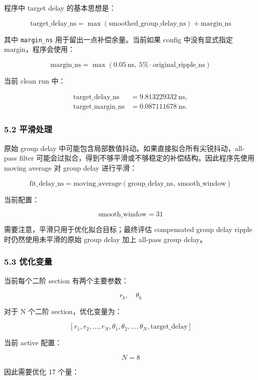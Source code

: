 \documentclass[
]{ctexart}
\begin{document}
程序中 target delay 的基本思想是：

\[
\mathrm{target\_delay\_ns}=\max(\mathrm{smoothed\_group\_delay\_ns})+\mathrm{margin\_ns}
\]

其中 \texttt{margin\_ns} 用于留出一点补偿余量。当前如果 config
中没有显式指定 margin，程序会使用：

\[
\mathrm{margin\_ns}=\max\left(0.05\ \mathrm{ns},\ 5\%\cdot\mathrm{original\_ripple\_ns}\right)
\]

当前 clean run 中：

\[
\begin{aligned}
\mathrm{target\_delay\_ns} &= 9.813229332\ \mathrm{ns},\\
\mathrm{target\_margin\_ns} &= 0.087111678\ \mathrm{ns}.
\end{aligned}
\]

\subsubsection{5.2 平滑处理}\label{ux5e73ux6ed1ux5904ux7406}

原始 group delay
中可能包含局部数值抖动。如果直接拟合所有尖锐抖动，all-pass filter
可能会过拟合，得到不够平滑或不够稳定的补偿结构。因此程序先使用 moving
average 对 group delay 进行平滑：

\[
\mathrm{fit\_delay\_ns}=\mathrm{moving\_average}(\mathrm{group\_delay\_ns},\ \mathrm{smooth\_window})
\]

当前配置：

\[
\mathrm{smooth\_window}=31
\]

需要注意，平滑只用于优化拟合目标；最终评估 compensated group delay
ripple 时仍然使用未平滑的原始 group delay 加上 all-pass group delay。

\subsubsection{5.3 优化变量}\label{ux4f18ux5316ux53d8ux91cf}

当前每个二阶 section 有两个主要参数：

\[
r_k,\quad \theta_k
\]

对于 N 个二阶 section，优化变量为：

\[
\left[r_1,r_2,\ldots,r_N,\theta_1,\theta_2,\ldots,\theta_N,\mathrm{target\_delay}\right]
\]

当前 active 配置：

\[
N=8
\]

因此需要优化 17 个量：
\end{document}
